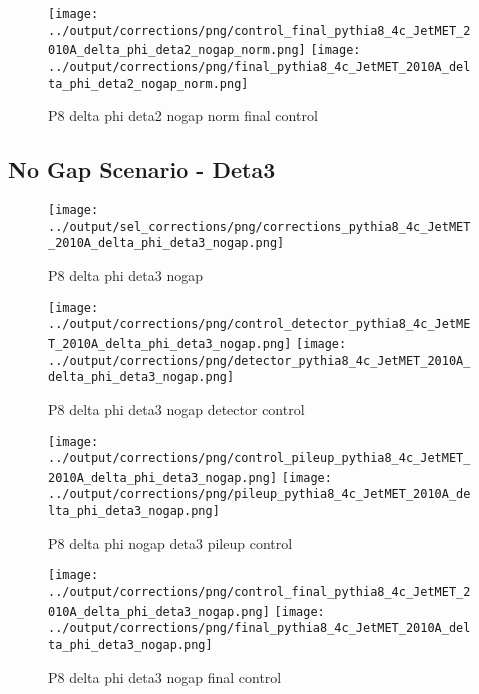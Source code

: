 \documentclass[11pt]{book}
\begin{document}
\begin{figure}[ht]
\centering
\texttt{[image: ../output/corrections/png/control\_final\_pythia8\_4c\_JetMET\_2010A\_delta\_phi\_deta2\_nogap\_norm.png]}
\texttt{[image: ../output/corrections/png/final\_pythia8\_4c\_JetMET\_2010A\_delta\_phi\_deta2\_nogap\_norm.png]}
\caption{P8 delta phi deta2 nogap norm final control}
\label{fig:p8_JetMET_2010A_delta_phi_deta2_nogap_norm_final_control}
\end{figure}


\clearpage
\subsection{No Gap Scenario - Deta3}
\begin{figure}[ht]
\centering
\texttt{[image: ../output/sel\_corrections/png/corrections\_pythia8\_4c\_JetMET\_2010A\_delta\_phi\_deta3\_nogap.png]}
\caption{P8 delta phi deta3 nogap}
\label{fig:p8_JetMET_2010A_delta_phi_deta3_nogap}
\end{figure}

\begin{figure}[ht]
\centering
\texttt{[image: ../output/corrections/png/control\_detector\_pythia8\_4c\_JetMET\_2010A\_delta\_phi\_deta3\_nogap.png]}
\texttt{[image: ../output/corrections/png/detector\_pythia8\_4c\_JetMET\_2010A\_delta\_phi\_deta3\_nogap.png]}
\caption{P8 delta phi deta3 nogap detector control}
\label{fig:p8_JetMET_2010A_delta_phi_deta3_nogap_detector_control}
\end{figure}

\begin{figure}[ht]
\centering
\texttt{[image: ../output/corrections/png/control\_pileup\_pythia8\_4c\_JetMET\_2010A\_delta\_phi\_deta3\_nogap.png]}
\texttt{[image: ../output/corrections/png/pileup\_pythia8\_4c\_JetMET\_2010A\_delta\_phi\_deta3\_nogap.png]}
\caption{P8 delta phi nogap deta3 pileup control}
\label{fig:p8_JetMET_2010A_delta_phi_deta3_nogap_pileup_control}
\end{figure}


\begin{figure}[ht]
\centering
\texttt{[image: ../output/corrections/png/control\_final\_pythia8\_4c\_JetMET\_2010A\_delta\_phi\_deta3\_nogap.png]}
\texttt{[image: ../output/corrections/png/final\_pythia8\_4c\_JetMET\_2010A\_delta\_phi\_deta3\_nogap.png]}
\caption{P8 delta phi deta3 nogap final control}
\label{fig:p8_JetMET_2010A_delta_phi_deta3_nogap_final_control}
\end{figure}
\end{document}
